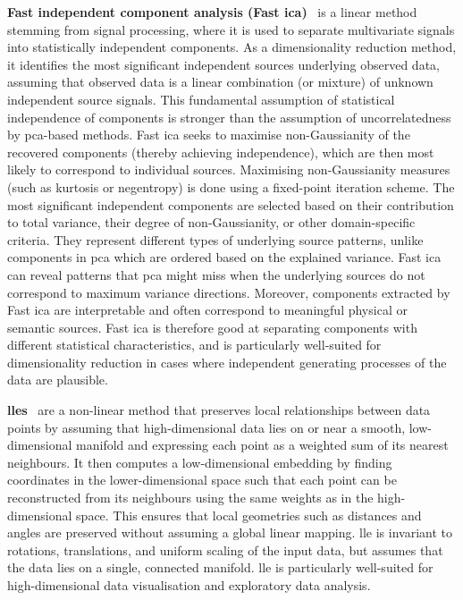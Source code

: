     \noindent \textbf{Fast independent component analysis (Fast \gls{ica})}~\citep{HyvOja00} is a linear method stemming from signal processing, where it is used to separate multivariate signals into statistically independent components. As a dimensionality reduction method, it identifies the most significant independent sources underlying observed data, assuming that observed data is a linear combination (or mixture) of unknown independent source signals. This fundamental assumption of statistical independence of components is stronger than the assumption of uncorrelatedness by \gls{pca}-based methods. Fast \gls{ica} seeks to maximise non-Gaussianity of the recovered components (thereby achieving independence), which are then most likely to correspond to individual sources. Maximising non-Gaussianity measures (such as kurtosis or negentropy) is done using a fixed-point iteration scheme. The most significant independent components are selected based on their contribution to total variance, their degree of non-Gaussianity, or other domain-specific criteria. They represent different types of underlying source patterns, unlike components in \gls{pca} which are ordered based on the explained variance. Fast \gls{ica} can reveal patterns that \gls{pca} might miss when the underlying sources do not correspond to maximum variance directions. Moreover, components extracted by Fast \gls{ica} are interpretable and often correspond to meaningful physical or semantic sources. Fast \gls{ica} is therefore good at separating components with different statistical characteristics, and is particularly well-suited for dimensionality reduction in cases where independent generating processes of the data are plausible.

    \noindent \textbf{\Glspl{lle}}~\citep{RowSau00} are a non-linear method that preserves local relationships between data points by assuming that high-dimensional data lies on or near a smooth, low-dimensional manifold and expressing each point as a weighted sum of its nearest neighbours. It then computes a low-dimensional embedding by finding coordinates in the lower-dimensional space such that each point can be reconstructed from its neighbours using the same weights as in the high-dimensional space. This ensures that local geometries such as distances and angles are preserved without assuming a global linear mapping. \gls{lle} is invariant to rotations, translations, and uniform scaling of the input data, but assumes that the data lies on a single, connected manifold. \gls{lle} is particularly well-suited for high-dimensional data visualisation and exploratory data analysis.

